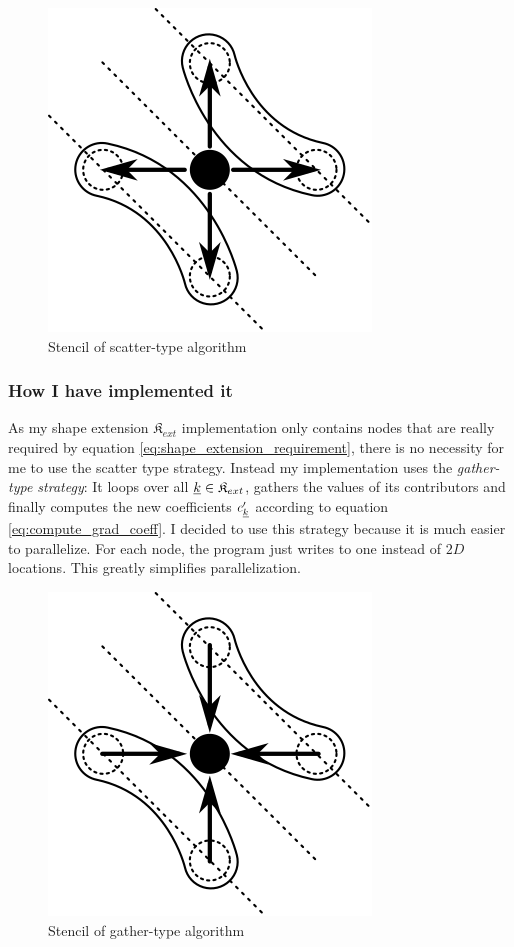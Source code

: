 \documentclass{article}
\begin{document}
\begin{figure}[H]
  \centering
  \includegraphics{grad_scatter_stencil}
  \caption{Stencil of scatter-type algorithm}
  \label{fig:grad_scatter_stencil}
\end{figure}

\subsubsection{How I have implemented it}
As my shape extension \(\mathfrak{K}_{ext}\) implementation only contains
nodes that are really required by equation \eqref{eq:shape_extension_requirement},
there is no necessity for me to use the scatter type strategy.
Instead my implementation uses the \emph{gather-type strategy}: It loops over all
\(\underline{k} \in \mathfrak{K}_{ext}\), gathers the values of its contributors
and finally computes the new coefficients \(c'_{\underline{k}}\) according to equation
\eqref{eq:compute_grad_coeff}.
I decided to use this strategy because it is much easier to parallelize.
For each node, the program just writes to one instead of \(2D\) locations.
This greatly simplifies parallelization.

\begin{figure}[H]
  \centering
  \includegraphics{grad_gather_stencil}
  \caption{Stencil of gather-type algorithm}
  \label{fig:grad_gather_stencil}
\end{figure}
\end{document}
